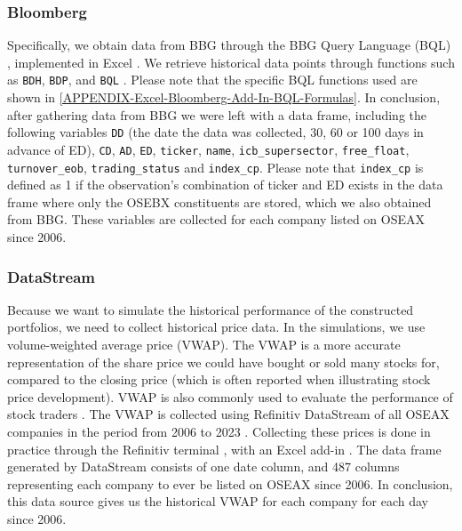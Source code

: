 \subsubsection{Bloomberg}

Specifically, we obtain data from BBG through the BBG Query Language (BQL) \parencite{bloomberg-professional-services-BQL}, implemented in Excel \parencite{BQL-fintools}. We retrieve historical data points through functions such as \texttt{BDH}, \texttt{BDP}, and \texttt{BQL} \parencite{dartmouth-BQL}. Please note that the specific BQL functions used are shown in \autoref{APPENDIX-Excel-Bloomberg-Add-In-BQL-Formulas}. In conclusion, after gathering data from BBG we were left with a data frame, including the following variables \texttt{DD} (the date the data was collected, 30, 60 or 100 days in advance of ED), \texttt{CD}, \texttt{AD}, \texttt{ED}, \texttt{ticker}, \texttt{name}, \texttt{icb\_supersector}, \texttt{free\_float}, \texttt{turnover\_eob},  \texttt{trading\_status} and \texttt{index\_cp}. Please note that \texttt{index\_cp} is defined as 1 if the observation's combination of ticker and ED exists in the data frame where only the OSEBX constituents are stored, which we also obtained from BBG. These variables are collected for each company listed on OSEAX since 2006.


\subsubsection{DataStream}
Because we want to simulate the historical performance of the constructed portfolios, we need to collect historical price data. In the simulations, we use volume-weighted average price (VWAP). The VWAP is a more accurate representation of the share price we could have bought or sold many stocks for, compared to the closing price (which is often reported when illustrating stock price development). VWAP is also commonly used to evaluate the performance of stock traders \parencite{madhavan-vwap}. The VWAP is collected using Refinitiv DataStream of all OSEAX companies in the period from 2006 to 2023 \parencite{nhh-data-stream}. Collecting these prices is done in practice through the Refinitiv terminal \parencite{lseg-refinitiv}, with an Excel add-in \parencite{refinitiv-excel-add-in}. The data frame generated by DataStream consists of one date column, and 487 columns representing each company to ever be listed on OSEAX since 2006. In conclusion, this data source gives us the historical VWAP for each company for each day since 2006.



